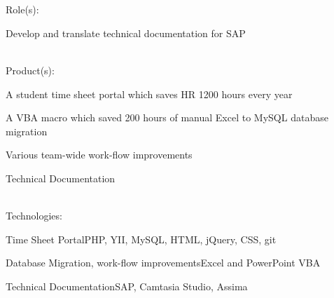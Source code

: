 \documentclass[letterpaper]{deedy-resume} %
\begin{document}
\sectionspace %
\\[\fpeval{\baseheight*\golden}]


\\[\fpeval{\baseheight*\golden}]

Role(s):

\begin{tightitemize}
    \item Develop and translate technical documentation for SAP
\end{tightitemize}

\\[\fpeval{\baseheight*\golden}]

Product(s):
\begin{tightitemize}
    \item A student time sheet portal which saves HR 1200 hours every year
    \item A VBA macro which saved 200 hours of manual Excel to MySQL database migration
    \item Various team-wide work-flow improvements
    \item Technical Documentation
\end{tightitemize}

\\[\fpeval{\baseheight*\golden}]

Technologies: \\
\begin{tightitemize}
    \item Time Sheet Portal\textemdash PHP, YII, MySQL, HTML, jQuery, CSS, git
    \item Database Migration, work-flow improvements\textemdash Excel and PowerPoint VBA
    \item Technical Documentation\textemdash SAP, Camtasia Studio, Assima
\end{tightitemize}

\sectionspace %



\newpage %

\end{document}
